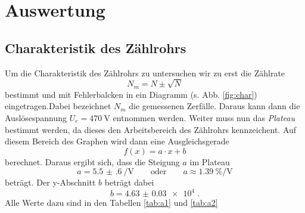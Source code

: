 \section{Auswertung}
\label{sec:Auswertung}

\subsection{Charakteristik des Zählrohrs}
Um die Charakteristik des Zählrohrs zu untersuchen wir zu erst die Zählrate
\begin{equation}
 N_m = N \pm \sqrt{N}
 \label{eqn:N}
\end{equation}
bestimmt und mit Fehlerbalcken in ein Diagramm (s. Abb. \ref{fig:char})
eingetragen.Dabei bezeichnet $N_m$ die gemessenen Zerfälle.
Daraus kann dann die Auslösespannung $ U_e = \SI{470}{\volt}$
entnommen werden. Weiter muss nun das \textit{Plateau} \cite{Anleitung}
bestimmt werden, da
dieses den Arbeitsbereich des Zählrohrs kennzeichent. Auf diesem Bereich
des Graphen wird dann eine Ausgleichsgerade
\begin{equation*}
  f\left(x \right) = a \cdot x + b
\end{equation*}
berechnet. Daraus ergibt sich, dass die Steigung $a$ im Plateau
\begin{equation*}
  a = \SI{5.5(6)}{\per\volt} \qquad \text{oder} \qquad  a \approx \SI{1.39}{\percent\per\volt}
\end{equation*}
beträgt. Der y-Abschnitt $b$ beträgt dabei
\begin{equation*}
  b = \SI{4.63(3)e4} \;.
\end{equation*}
Alle Werte dazu sind in den Tabellen \ref{tab:a1} und \ref{tab:a2}

